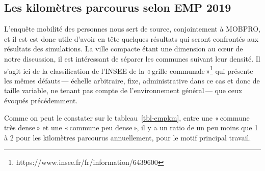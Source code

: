 \documentclass[
  9pt,
  a4paper,
  DIV=11]{scrreprt}
\begin{document}
\subsection{Les kilomètres parcourus selon EMP
2019}\label{les-kilomuxe8tres-parcourus-selon-emp-2019}

L'enquête mobilité des personnes nous sert de source, conjointement à
MOBPRO, et il est est donc utile d'avoir en tête quelques résultats qui
seront confrontés aux résultats des simulations. La ville compacte étant
une dimension au cœur de notre discussion, il est intéressant de séparer
les communes suivant leur densité. Il s'agit ici de la classification de
l'INSEE de la «\,grille communale\,»\footnote{https://www.insee.fr/fr/information/6439600}
qui présente les mêmes défauts\,--- échelle arbitraire, fixe,
administrative dans ce cas et donc de taille variable, ne tenant pas
compte de l'environnement général\,--- que ceux évoqués précédemment.

Comme on peut le constater sur le tableau~\ref{tbl-empkm}, entre une
«\,commune très dense\,» et une «\,commune peu dense\,», il y a un ratio
de un peu moins que 1 à 2 pour les kilomètres parcourus annuellement,
pour le motif principal travail.

\setlength{\LTpost}{0mm}
\end{document}
